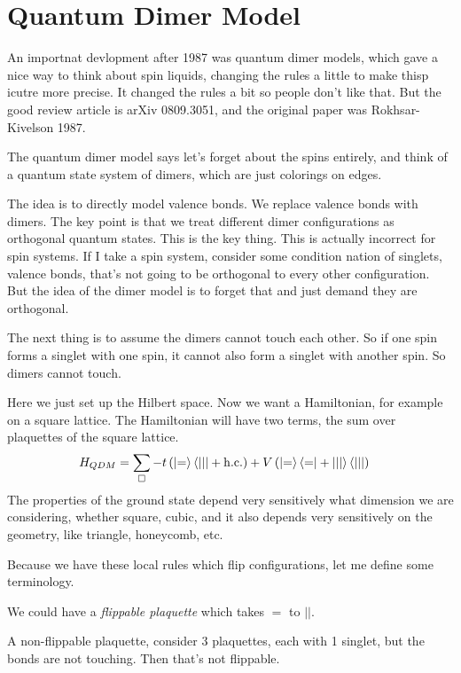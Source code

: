 \section{Quantum Dimer Model}
An importnat devlopment after 1987 was quantum dimer models,
which gave a nice way to think about spin liquids,
changing the rules a little to make thisp icutre more precise.
It changed the rules a bit so people don't like that.
But the good review article is arXiv 0809.3051,
and the original paper was Rokhsar-Kivelson 1987.

The quantum dimer model says let's forget about the spins entirely,
and think of a quantum state system of dimers,
which are just colorings on edges.

The idea is to directly model valence bonds.
We replace valence bonds with dimers.
The key point is that we treat different dimer configurations as orthogonal
quantum states.
This is the key thing.
This is actually incorrect for spin systems.
If I take a spin system,
consider some condition nation of singlets, valence bonds,
that's not going to be orthogonal to every other configuration.
But the idea of the dimer model is to forget that and just demand they are
orthogonal.

The next thing is to assume the dimers cannot touch each other.
So if one spin forms a singlet with one spin,
it cannot also form a singlet with another spin.
So dimers cannot touch.

Here we just set up the Hilbert space.
Now we want a Hamiltonian,
for example on a square lattice.
The Hamiltonian will have two terms,
the sum over plaquettes of the square lattice.
\begin{align}
    H_{QDM}
    &=
    \sum_{\square}
    -t \left(
        \ket{=}\bra{||}
        + \mathrm{h.c.}
    \right)
    +
    V
    \left( 
    \ket{=}\bra{=}
    +
    \ket{||}\bra{||}
    \right)
\end{align}
The properties of the ground state depend very sensitively what dimension we are
considering,
whether square, cubic,
and it also depends very sensitively on the geometry,
like triangle, honeycomb, etc.

Because we have these local rules which flip configurations,
let me define some terminology.

We could have a \emph{flippable plaquette}
which takes $=$ to $||$.

A non-flippable plaquette,
consider 3 plaquettes,
each with 1 singlet,
but the bonds are not touching.
Then that's not flippable.

